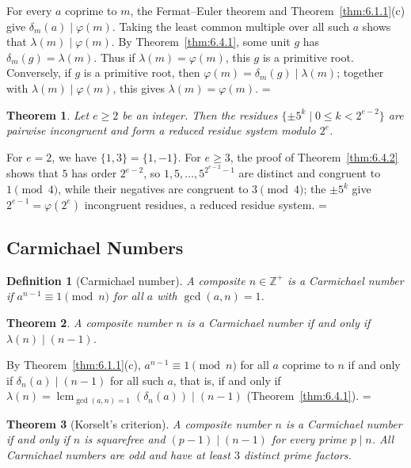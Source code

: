 \documentclass[11pt]{article}
\makeatletter
\theoremstyle{ntstyle}
\newtheorem{theorem}{Theorem}[subsection]
\newtheorem{definition}{Definition}[subsection]
\let\nt@closedisplay\]
\def\nt@guardedclose{\@ifnextchar\par{\nt@closeafterpar}{\@ifnextchar\end{\postdisplaypenalty\@M\nt@closedisplay}{\nt@closedisplay}}}
\def\nt@closeafterpar\par{\@ifnextchar\par{\nt@closeafterpar}{\@ifnextchar\end{\postdisplaypenalty\@M\nt@closedisplay\par}{\nt@closedisplay\par}}}
\renewenvironment{proof}[1][\proofname]{\par
  \pushQED{\qed}\normalfont\topsep\medskipamount\edef\nt@afterproof{\@endparpenalty=\the\@endparpenalty\relax}\@beginparpenalty\@M\@endparpenalty\@M\let\]\nt@guardedclose\trivlist\item[]\textit{#1\@addpunct{.}} \ignorespaces}{\ifvmode\addpenalty\@M\fi\popQED\nt@afterproof\endtrivlist\@endpefalse}
\DeclareMathOperator{\lcm}{lcm}
\makeatother
\begin{document}
\begin{proof} For every $a$ coprime to $m$, the Fermat--Euler theorem and
	Theorem~\ref{thm:6.1.1}(c) give
	$\delta_m(a)\mid\varphi(m)$. Taking the least common multiple over all
	such $a$ shows that $\lambda(m)\mid\varphi(m)$. By
	Theorem~\ref{thm:6.4.1}, some unit $g$ has
	$\delta_m(g)=\lambda(m)$. Thus if $\lambda(m)=\varphi(m)$, this $g$ is
	a primitive root. Conversely, if $g$ is a primitive root, then
	$\varphi(m)=\delta_m(g)\mid\lambda(m)$; together with
	$\lambda(m)\mid\varphi(m)$, this gives $\lambda(m)=\varphi(m)$.
\end{proof}
\begin{theorem}\label{thm:6.4.4} Let $e \ge 2$ be an integer. Then the residues
	$\{\pm5^k \mid 0\le k<2^{e-2}\}$ are pairwise incongruent and form a reduced
	residue system modulo $2^{e}$.
\end{theorem}

\begin{proof} For $e = 2$, we have $\{1, 3\} = \{1, -1\}$. For $e
		\ge 3$, the proof of Theorem~\ref{thm:6.4.2} shows that $5$ has
	order $2^{e-2}$, so $1, 5, \ldots,
		5^{2^{e-2}-1}$ are distinct and congruent to $1 \pmod{4}$, while their negatives are
	congruent to $3 \pmod{4}$; the $\pm 5^{k}$ give $2^{e-1} = \varphi(2^{e})$
	incongruent residues, a reduced residue system.
\end{proof}
\subsection{Carmichael Numbers}

\begin{definition}[Carmichael number]\label{def:6.5.1} A composite
	$n \in \mathbb{Z}^+$ is a Carmichael number if $a^{n-1} \equiv 1
		\pmod{n}$ for all $a$ with $\gcd(a, n) = 1$.
\end{definition}
\begin{theorem}\label{thm:6.5.1} A composite number $n$ is a
	Carmichael number if and only if $\lambda(n) \mid (n-1)$.
\end{theorem}

\begin{proof} By Theorem~\ref{thm:6.1.1}(c), $a^{n-1} \equiv 1
		\pmod{n}$ for all $a$ coprime to $n$ if and only if $\delta_n(a) \mid
		(n-1)$ for all such $a$, that is, if and only if $\lambda(n) =
		\lcm_{\gcd(a, n)=1}(\delta_n(a)) \mid (n-1)$ (Theorem~\ref{thm:6.4.1}).
\end{proof}
\begin{theorem}[Korselt's criterion]\label{thm:6.5.2} A composite
	number $n$ is a Carmichael number if and only if $n$ is squarefree
	and $(p-1) \mid (n-1)$ for every prime $p \mid n$. All Carmichael
	numbers are odd and have at least $3$ distinct prime factors.
\end{theorem}
\end{document}
